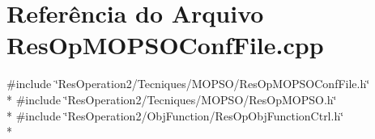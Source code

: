 \section{Referência do Arquivo Res\+Op\+M\+O\+P\+S\+O\+Conf\+File.\+cpp}
\label{_2_tecniques_2_m_o_p_s_o_2_res_op_m_o_p_s_o_conf_file_8cpp}
{\ttfamily \#include \char`\"{}Res\+Operation2/\+Tecniques/\+M\+O\+P\+S\+O/\+Res\+Op\+M\+O\+P\+S\+O\+Conf\+File.\+h\char`\"{}}\\*
{\ttfamily \#include \char`\"{}Res\+Operation2/\+Tecniques/\+M\+O\+P\+S\+O/\+Res\+Op\+M\+O\+P\+S\+O.\+h\char`\"{}}\\*
{\ttfamily \#include \char`\"{}Res\+Operation2/\+Obj\+Function/\+Res\+Op\+Obj\+Function\+Ctrl.\+h\char`\"{}}\\*
